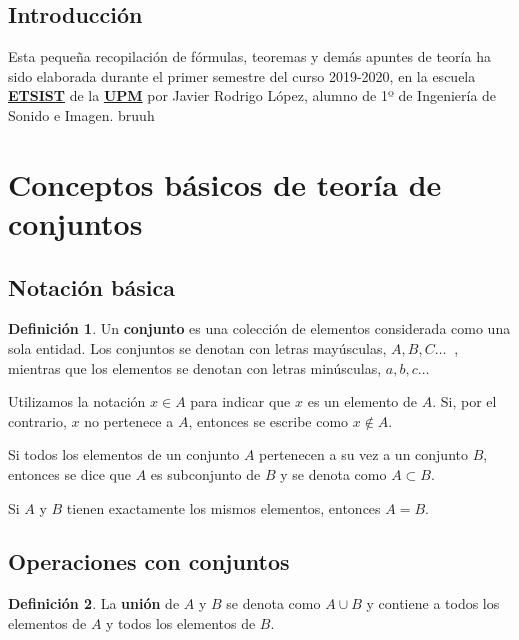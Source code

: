 \documentclass[a4paper]{book}
\numberwithin{figure}{section}
\numberwithin{equation}{subsection}
\numberwithin{figure}{chapter}
\theoremstyle{definition}
\newtheorem{definicion}{Definición}
\begin{document}
\begin{figure}[t!]
\begin{subfigure}[b]{0.25\linewidth}
	\end{subfigure}
\end{figure}


\newpage
\setlength{\parskip}{0.5em}

\section*{Introducción}
Esta pequeña recopilación de fórmulas, teoremas y demás apuntes de teoría ha sido elaborada durante el primer semestre del curso 2019-2020, en la escuela \href{https://www.etsist.upm.es/}{\textbf{ETSIST}} de la \href{http://www.upm.es/}{\textbf{UPM}} por Javier Rodrigo López, alumno de 1º de Ingeniería de Sonido e Imagen.
bruuh
\newpage

\setlength{\parskip}{0em}
\tableofcontents
\setlength{\parskip}{0.5em}

\chapter*{Conceptos básicos de teoría de conjuntos}
\section*{Notación básica}
\begin{definicion}
	Un \textbf{conjunto} es una colección de elementos considerada como una sola entidad. Los conjuntos se denotan con letras mayúsculas, $A,B,C \ldots \ $ , mientras que los elementos se denotan con letras minúsculas, $a,b,c \ldots $

	Utilizamos la notación $x\in A$ para indicar que $x$ es un elemento de $A$. Si, por el contrario, $x$ no pertenece a $A$, entonces se escribe como $x\not \in A$.

	Si todos los elementos de un conjunto $A$ pertenecen a su vez a un conjunto $B$, entonces se dice que $A$ es subconjunto de $B$ y se denota como $A\subset B$.

	Si $A$ y $B$ tienen exactamente los mismos elementos, entonces $A=B$.
\end{definicion}

\section*{Operaciones con conjuntos}
\begin{definicion}
	La \textbf{unión} de $A$ y $B$ se denota como $A\cup B$ y contiene a todos los elementos de $A$ y todos los elementos de $B$.
\end{definicion}
\end{document}
